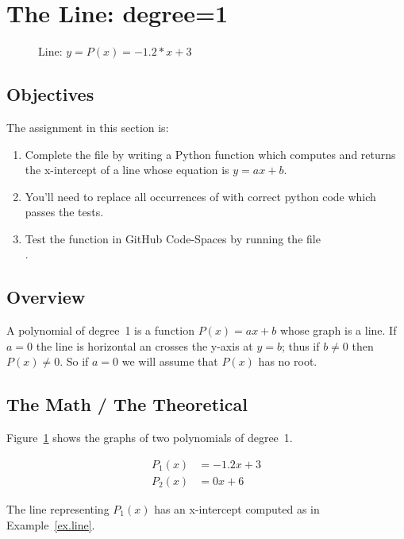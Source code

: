 \section{The Line: degree=1}
\label{sec.line}

\begin{figure}
  \centering
  
  \caption{Line: $y = P(x) = -1.2*x + 3$}
  \label{fig.line}
\end{figure}


\subsection{Objectives}
The assignment in this section is:
\begin{enumerate}
\item Complete the file  by writing a Python
  function which computes and returns the x-intercept of a line whose
  equation is ${y=a x + b}$.
\item You'll need to replace all occurrences of  with correct python code which passes the
  tests.

\item Test the function in GitHub Code-Spaces by running the file\\
  .
\end{enumerate}

\subsection{Overview}


A polynomial of degree~1 is a function $P(x)=a x + b$ whose graph is a
line.  If $a=0$ the line is horizontal an crosses the y-axis at $y=b$;
thus if $b\neq 0$ then $P(x)\neq 0$.  So if $a=0$ we will assume that
$P(x)$ has no root.

\subsection{The Math / The Theoretical}


Figure~\ref{fig.line} shows the graphs of two polynomials of degree~1.

\begin{align*}
  P_1(x) &= -1.2 x + 3\\
  P_2(x) &= 0 x + 6
\end{align*}

The line representing $P_1(x)$ has an x-intercept computed as in
Example~\ref{ex.line}.


